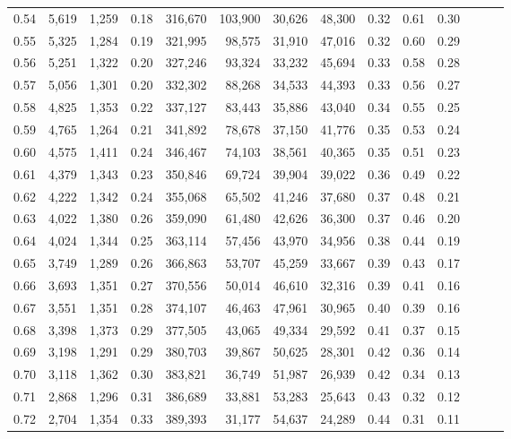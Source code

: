\begin{tabular}{rrrrrrrrrrrrrr}
0.54 &  5,619 &  1,259 &  0.18 &  316,670 &  103,900 &  30,626 &  48,300 &  0.32 &  0.61 &      0.30 \\
0.55 &  5,325 &  1,284 &  0.19 &  321,995 &   98,575 &  31,910 &  47,016 &  0.32 &  0.60 &      0.29 \\
0.56 &  5,251 &  1,322 &  0.20 &  327,246 &   93,324 &  33,232 &  45,694 &  0.33 &  0.58 &      0.28 \\
0.57 &  5,056 &  1,301 &  0.20 &  332,302 &   88,268 &  34,533 &  44,393 &  0.33 &  0.56 &      0.27 \\
0.58 &  4,825 &  1,353 &  0.22 &  337,127 &   83,443 &  35,886 &  43,040 &  0.34 &  0.55 &      0.25 \\
0.59 &  4,765 &  1,264 &  0.21 &  341,892 &   78,678 &  37,150 &  41,776 &  0.35 &  0.53 &      0.24 \\
0.60 &  4,575 &  1,411 &  0.24 &  346,467 &   74,103 &  38,561 &  40,365 &  0.35 &  0.51 &      0.23 \\
0.61 &  4,379 &  1,343 &  0.23 &  350,846 &   69,724 &  39,904 &  39,022 &  0.36 &  0.49 &      0.22 \\
0.62 &  4,222 &  1,342 &  0.24 &  355,068 &   65,502 &  41,246 &  37,680 &  0.37 &  0.48 &      0.21 \\
0.63 &  4,022 &  1,380 &  0.26 &  359,090 &   61,480 &  42,626 &  36,300 &  0.37 &  0.46 &      0.20 \\
0.64 &  4,024 &  1,344 &  0.25 &  363,114 &   57,456 &  43,970 &  34,956 &  0.38 &  0.44 &      0.19 \\
0.65 &  3,749 &  1,289 &  0.26 &  366,863 &   53,707 &  45,259 &  33,667 &  0.39 &  0.43 &      0.17 \\
0.66 &  3,693 &  1,351 &  0.27 &  370,556 &   50,014 &  46,610 &  32,316 &  0.39 &  0.41 &      0.16 \\
0.67 &  3,551 &  1,351 &  0.28 &  374,107 &   46,463 &  47,961 &  30,965 &  0.40 &  0.39 &      0.16 \\
0.68 &  3,398 &  1,373 &  0.29 &  377,505 &   43,065 &  49,334 &  29,592 &  0.41 &  0.37 &      0.15 \\
0.69 &  3,198 &  1,291 &  0.29 &  380,703 &   39,867 &  50,625 &  28,301 &  0.42 &  0.36 &      0.14 \\
0.70 &  3,118 &  1,362 &  0.30 &  383,821 &   36,749 &  51,987 &  26,939 &  0.42 &  0.34 &      0.13 \\
0.71 &  2,868 &  1,296 &  0.31 &  386,689 &   33,881 &  53,283 &  25,643 &  0.43 &  0.32 &      0.12 \\
0.72 &  2,704 &  1,354 &  0.33 &  389,393 &   31,177 &  54,637 &  24,289 &  0.44 &  0.31 &      0.11 \\

\end{tabular}
